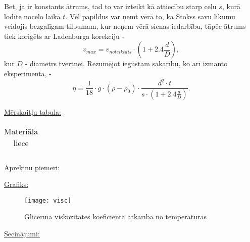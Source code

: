 \documentclass[a4paper,12pt]{article}
\begin{document}
Bet, ja ir konstants ātrums, tad to var izteikt kā attiecību starp ceļu $s$,
kurā lodīte noceļo laikā $t$. Vēl papildus var ņemt vērā to, ka Stokss savu
likumu veidojis bezgalīgam tilpumam, kur neņem vērā sienas iedarbību, tāpēc
ātrums tiek koriģēts ar Ladenburga korekciju -
$$
v_{max} = v_{noteiktais}\cdot\left(1+2.4\frac{d}{D}\right),
$$
kur $D$ - diametrs tvertnei. Rezumējot iegūstam sakarību, ko arī izmanto
eksperimentā, -
$$
\eta = \frac{1}{18}\cdot g\cdot (\rho-\rho_0)\cdot \frac{d^2\cdot t}{s\cdot \left(1+2.4\frac{d}{D}\right)}.
$$
\newpage

\noindent
\ul{Mērskaitļu tabula:} \\

\begin{table}[h!]
  \begin{adjustbox}{width=1\textwidth}
  \begin{tabular}{||c|c|c|c|c|c|c|c|c|c||}
  \hline 

   \hline 
  \end{tabular}
  \end{adjustbox}

  \caption{Materiāla liece}
\end{table}

\noindent
\ul{Aprēķinu piemēri:}\\

\noindent


\noindent
\newpage

\noindent
\ul{Grafiks:}

\begin{figure}[h!]
  \centering
\texttt{[image: visc]}
\caption{Glicerīna viskozitātes koeficienta atkarība no temperatūras}
\end{figure}


\noindent
\ul{Secinājumi:} \\
\end{document}
